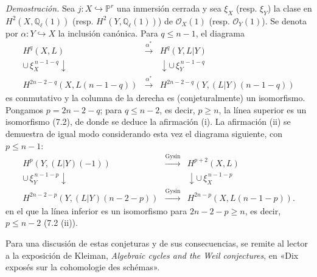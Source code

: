 \emph{Demostración.} Sea $j:X\hookrightarrow\mathbb P^r$ una inmersión cerrada y sea $\xi_X$ (resp. $\xi_Y$) la clase en $H^2(X,\mathbb Q_\ell(1))$ (resp. $H^2(Y,\mathbb Q_\ell(1))$) de $\mathcal O_X(1)$ (resp. $\mathcal O_Y(1)$). Se denota por $\alpha:Y\hookrightarrow X$ la inclusión canónica. Para $q\le n-1$, el diagrama
\[
\begin{array}{ccc}
H^q(X,L)&\xrightarrow{\alpha^*}&H^q(Y,L|Y)\\
\cup\,\xi_X^{\,n-1-q}\downarrow&&\downarrow\cup\,\xi_Y^{\,n-1-q}\\
H^{2n-2-q}(X,L(n-1-q))&\xrightarrow{\alpha^*}&
H^{2n-2-q}(Y,(L|Y)(n-1-q))
\end{array}
\]
es conmutativo y la columna de la derecha es (conjeturalmente) un isomorfismo. Pongamos $p=2n-2-q$; para $q\le n-2$, es decir, $p\ge n$, la línea superior es un isomorfismo (7.2), de donde se deduce la afirmación (i). La afirmación (ii) se demuestra de igual modo considerando esta vez el diagrama siguiente, con $p\le n-1$:
\[
\begin{array}{ccc}
H^p(Y,(L|Y)(-1))&\xrightarrow{\mathrm{Gysin}}&H^{p+2}(X,L)\\
\cup\,\xi_Y^{\,n-1-p}\downarrow&&\downarrow\cup\,\xi_X^{\,n-1-p}\\
H^{2n-2-p}(Y,(L|Y)(n-2-p))&\xrightarrow{\mathrm{Gysin}}&
H^{2n-p}(X,L(n-1-p)).
\end{array}
\]
en el que la línea inferior es un isomorfismo para $2n-2-p\ge n$, es decir, $p\le n-2$ (7.2 (ii)).

Para una discusión de estas conjeturas y de sus consecuencias, se remite al lector a la exposición de Kleiman, \emph{Algebraic cycles and the Weil conjectures}, en «Dix exposés sur la cohomologie des schémas».
